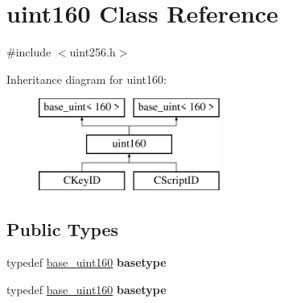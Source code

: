 \hypertarget{classuint160}{}\section{uint160 Class Reference}
\label{classuint160}


{\ttfamily \#include $<$uint256.\+h$>$}

Inheritance diagram for uint160\+:\begin{figure}[H]
\begin{center}
\leavevmode
\includegraphics[height=3.000000cm]{classuint160}
\end{center}
\end{figure}
\subsection*{Public Types}
\begin{DoxyCompactItemize}
\item 
\mbox{\label{classuint160_a13cb94ab216887d7f6eb7a683f00b40c}} 
typedef \mbox{\hyperlink{classbase__uint}{base\+\_\+uint160}} {\bfseries basetype}
\item 
\mbox{\label{classuint160_a13cb94ab216887d7f6eb7a683f00b40c}} 
typedef \mbox{\hyperlink{classbase__uint}{base\+\_\+uint160}} {\bfseries basetype}
\end{DoxyCompactItemize}
